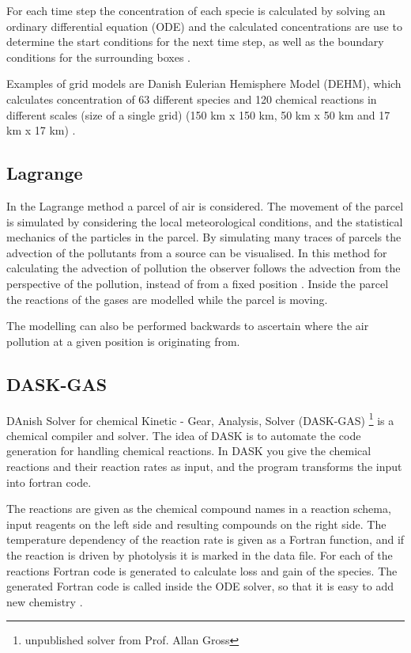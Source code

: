 For each time step the concentration of each specie is calculated by solving an ordinary differential equation (ODE) and the calculated concentrations are use to determine the start conditions for the next time step, as well as the boundary conditions for the surrounding boxes \cite{zlatev1995computer}.

Examples of grid models are Danish Eulerian Hemisphere Model (DEHM)\cite{christensen1997}, which calculates concentration of 63 different species and 120 chemical reactions in different scales (size of a single grid) (150 km x 150 km, 50 km x 50 km and 17 km x 17 km)  \cite{frohm2002}.

\subsection{Lagrange}
In the Lagrange method a parcel of air is considered. The movement of the parcel is simulated by considering the local meteorological conditions, and the statistical mechanics of the particles in the parcel. By simulating many traces of parcels the advection of the pollutants from a source can be visualised. In this method for calculating the advection of pollution the observer follows the advection from the perspective of the pollution, instead of from a fixed position \cite{seinfeld1997atmospheric}. Inside the parcel the reactions of the gases are modelled while the parcel is moving. 

The modelling can also be performed backwards to ascertain where the air pollution at a given position is originating from.


\subsection{DASK-GAS}
DAnish Solver for chemical Kinetic - Gear, Analysis, Solver (DASK-GAS) \footnote{unpublished solver from Prof. Allan Gross} is a chemical compiler and solver. The idea of DASK is to automate the code generation for handling chemical reactions. In DASK you give the chemical reactions and their reaction rates as input, and the program transforms the input into fortran code.  

The reactions are given as the chemical compound names in a reaction schema, input reagents on the left side and resulting compounds on the right side. The temperature dependency of the reaction rate is given as a Fortran function, and if the reaction is driven by photolysis it is marked in the data file. For each of the reactions Fortran code is generated to calculate loss and gain of the species. The generated Fortran code is called inside the ODE solver, so that it is easy to add new chemistry \cite{hertel1993}.

